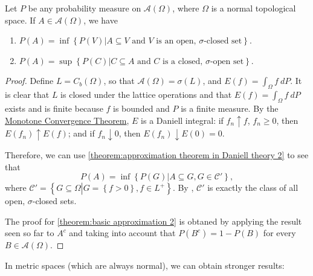 \begin{thrm}\label{theorem:basic approximation}
		Let \(P\) be any probability measure on \(\mathcal{A}(\Omega)\), where \(\Omega\) is a normal topological space. If \(A\in \mathcal{A}(\Omega)\), we have
		\begin{enumerate}
		\item\label{theorem:basic approximation 1}
 \(P(A)=\inf\left\{P(V)\left|A\subseteq V \text{ and } V \text{ is an open, }\sigma\text{-closed set}\right.\right\}\).
		\item\label{theorem:basic approximation 2}
 \(P(A)=\sup\left\{P(C)\left|C\subseteq A \text{ and } C \text{ is a closed, }\sigma\text{-open set}\right.\right\}\).
		\end{enumerate}
\end{thrm}
\begin{proof}
		Define \(L=C_b(\Omega)\), so that \(\mathcal{A}(\Omega)=\sigma(L)\), and \(E(f)=\int_{\Omega}f~dP\). It is clear that \(L\) is closed under the lattice operations and that \(E(f)=\int_{\Omega}f~dP\) exists and is finite because \(f\) is bounded and \(P\) is a finite measure. By the \hyperref[theorem:Extended Monotone Convergence]{Monotone Convergence Theorem}, \(E\) is a Daniell integral: if \(f_n\uparrow f\), \(f_n\geq 0\), then \(E(f_n)\uparrow E(f)\); and if \(f_n\downarrow 0\), then \(E(f_n)\downarrow E(0)=0\).

		Therefore, we can use \cref{theorem:approximation theorem in Daniell theory 2} to see that
		\[
				P(A)=\inf\left\{P(G)\left|A\subseteq G, G\in\mathcal{C}'\right.\right\}
		,\]
where \(\mathcal{C}'=\left\{G\subseteq\Omega\left|G=\left\{f>0\right\}, f\in L^{+}\right.\right\}\). By , \(\mathcal{C}'\) is exactly the class of all open, \(\sigma\)-closed sets. 

The proof for \ref{theorem:basic approximation 2} is obtaned by applying the result seen so far to \(A^c\) and taking into account that \(P(B^c)=1-P(B)\) for every \(B\in\mathcal{A}(\Omega)\).
\end{proof}

In metric spaces (which are always normal), we can obtain stronger results:

